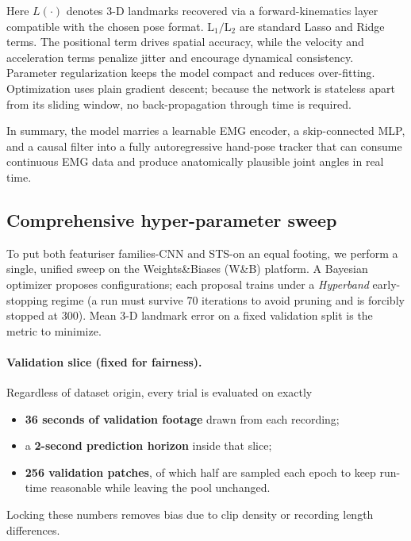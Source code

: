 Here \(L(\cdot)\) denotes 3-D landmarks recovered via a forward-kinematics layer
compatible with the chosen pose format. $\text{L}_{1} / \text{L}_{2}$ are standard Lasso and Ridge terms. The positional term drives spatial
accuracy, while the velocity and acceleration terms penalize jitter and
encourage dynamical consistency. Parameter regularization keeps the model
compact and reduces over-fitting.
Optimization uses plain gradient descent; because the network is stateless
apart from its sliding window, no back-propagation through time is required.

\medskip\noindent
In summary, the model marries a learnable EMG encoder, a skip-connected MLP,
and a causal filter into a fully autoregressive hand-pose tracker that can
consume continuous EMG data and produce anatomically plausible joint angles in
real time.

\subsection{Comprehensive hyper-parameter sweep}

To put both featuriser families-CNN and STS-on an equal footing, we perform a
single, unified sweep on the Weights\&Biases (W\&B) platform.
A Bayesian optimizer proposes configurations; each proposal trains under a
\emph{Hyperband} early-stopping regime (a run must survive 70 iterations to
avoid pruning and is forcibly stopped at 300).
Mean 3-D landmark error on a fixed validation split is the metric to minimize.

\paragraph{Validation slice (fixed for fairness).}
Regardless of dataset origin, every trial is evaluated on exactly

\begin{itemize}
  \item \textbf{36 seconds of validation footage} drawn from each recording;
  \item a \textbf{2-second prediction horizon} inside that slice;
  \item \textbf{256 validation patches}, of which half are sampled each epoch
        to keep run-time reasonable while leaving the pool unchanged.
\end{itemize}

Locking these numbers removes bias due to clip density or recording length
differences.


